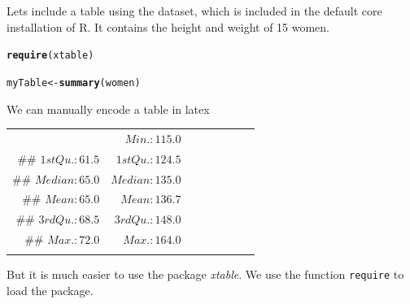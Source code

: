 \documentclass{article}\usepackage[]{graphicx}\usepackage[]{color}
\makeatletter
\newcommand{\hlstd}[1]{\textcolor[rgb]{0.345,0.345,0.345}{#1}}%
\newcommand{\hlkwb}[1]{\textcolor[rgb]{0.69,0.353,0.396}{#1}}%
\newcommand{\hlkwd}[1]{\textcolor[rgb]{0.737,0.353,0.396}{\textbf{#1}}}%
\newenvironment{kframe}{%
 \def\at@end@of@kframe{}%
 \ifinner\ifhmode%
  \def\at@end@of@kframe{\end{minipage}}%
  \begin{minipage}{\columnwidth}%
 \fi\fi%
 \def\FrameCommand##1{\hskip\@totalleftmargin \hskip-\fboxsep
 \colorbox{shadecolor}{##1}\hskip-\fboxsep
     \hskip-\linewidth \hskip-\@totalleftmargin \hskip\columnwidth}%
 \MakeFramed {\advance\hsize-\width
   \@totalleftmargin\z@ \linewidth\hsize
   \@setminipage}}%
 {\par\unskip\endMakeFramed%
 \at@end@of@kframe}
\newenvironment{knitrout}{}{} %
\newcommand{\Rfunction}[1]{{\texttt{#1}}}
\newcommand{\Rpackage}[1]{\textit{#1}}
\makeatother
\begin{document}
Lets include a table using the dataset,  which is included in the default core installation of R. It contains the height and weight of 15 women.

\begin{knitrout}
\color{fgcolor}\begin{kframe}
\begin{alltt}
\hlkwd{require}\hlstd{(xtable)}
\end{alltt}


{\ttfamily\noindent\itshape\color{messagecolor}{\#\# Loading required package: xtable}}\begin{alltt}
\hlstd{myTable}\hlkwb{<-}\hlkwd{summary}\hlstd{(women)}
\end{alltt}
\end{kframe}
\end{knitrout}

We can manually encode a table in latex 


\begin{center}
\begin{tabular}{rrrrrrrr} 

\begin{knitrout}
\definecolor{shadecolor}{rgb}{0.969, 0.969, 0.969}\color{fgcolor}\begin{kframe}
\begin{verbatim}
## $ Min.   :58.0   $&$ Min.   :115.0   $\\
## $ 1st Qu.:61.5   $&$ 1st Qu.:124.5   $\\
## $ Median :65.0   $&$ Median :135.0   $\\
## $ Mean   :65.0   $&$ Mean   :136.7   $\\
## $ 3rd Qu.:68.5   $&$ 3rd Qu.:148.0   $\\
## $ Max.   :72.0   $&$ Max.   :164.0   $\\
\end{verbatim}
\end{kframe}
\end{knitrout}
\end{tabular}
\end{center}

But it is much easier to use the package \Rpackage{xtable}. We use the function \Rfunction{require} to load the package.
\end{document}
